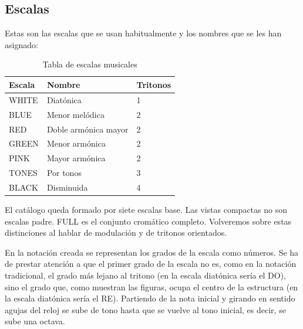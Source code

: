 \documentclass[]{report}
\begin{document}
\subsection{Escalas}

Estas son las escalas que se usan habitualmente y los nombres que se les han asignado:

\begin{table}[H]
	\centering
	\small
	\begin{tabular}{lll}
		\toprule
		\textbf{\textsf{Escala}} & \textbf{Nombre}       & \textbf{Tritonos} \\
		\midrule
		\textsf{WHITE}           & Diatónica             & 1 \\
		\textsf{BLUE}            & Menor melódica        & 2 \\
		\textsf{RED}             & Doble armónica mayor  & 2 \\
		\textsf{GREEN}           & Menor armónica        & 2 \\
		\textsf{PINK}            & Mayor armónica        & 2 \\
		\textsf{TONES}           & Por tonos             & 3 \\
		\textsf{BLACK}           & Disminuida            & 4 \\
		\bottomrule
	\end{tabular}
	\caption{Tabla de escalas musicales}\label{tab:scale-name-equivalences}
\end{table}

El catálogo queda formado por siete escalas base. Las vistas compactas no son
escalas padre. \textsf{FULL} es el conjunto cromático completo. Volveremos sobre
estas distinciones al hablar de modulación y de tritonos orientados.

En la notación creada se representan los grados de la escala como números. Se ha de prestar atención a que el primer grado de la escala no es, como en la notación tradicional, el grado más lejano al tritono (en la escala diatónica sería el DO), sino el grado que, como muestran las figuras, ocupa el centro de la estructura (en la escala diatónica sería el RE). Partiendo de la nota inicial y girando en sentido agujas del reloj se sube de tono hasta que se vuelve al tono inicial, es decir, se sube una octava.
\end{document}
